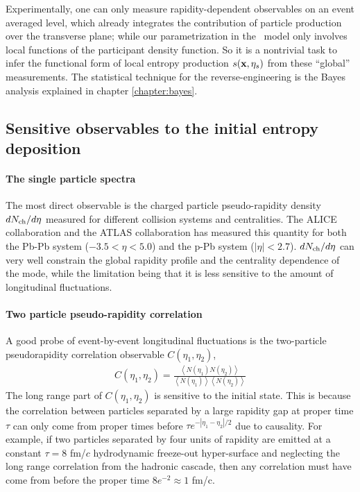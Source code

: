 Experimentally, one can only measure rapidity-dependent observables on an event averaged level, which already integrates the contribution of particle production over the transverse plane; while our parametrization in the \trento\ model only involves local functions of the participant density function.
So it is a nontrivial task to infer the functional form of local entropy production $s(\mathbf x, \eta_s)$ from these ``global'' measurements.
The statistical technique for the reverse-engineering is the Bayes analysis explained in chapter \ref{chapter:bayes}.

\subsection{Sensitive observables to the initial entropy deposition}
\paragraph{The single particle spectra}
The most direct observable is the charged particle pseudo-rapidity density $dN_\text{ch}/d\eta$ measured for different collision systems and centralities.
The ALICE collaboration and the ATLAS collaboration has measured this quantity for both the Pb-Pb system ($-3.5<\eta<5.0$) and the p-Pb system ($|\eta| < 2.7$).
$dN_\text{ch}/d\eta$ can very well constrain the global rapidity profile and the centrality dependence of the mode, while the limitation being that it is less sensitive to the amount of longitudinal fluctuations.

\paragraph{Two particle pseudo-rapidity correlation}
A good probe of event-by-event longitudinal fluctuations is the two-particle pseudorapidity correlation observable $C(\eta_1, \eta_2)$,
\begin{eqnarray}
C(\eta_1, \eta_2) = \frac{ \left\langle N(\eta_1)N(\eta_2) \right\rangle}{\left\langle N(\eta_1)\right\rangle\left\langle N(\eta_2) \right\rangle}
\end{eqnarray}
The long range part of $C(\eta_1, \eta_2)$ is sensitive to the initial state.
This is because the correlation between particles separated by a large rapidity gap at proper time $\tau$ can only come from proper times before $\tau e^{-|\eta_1-\eta_2|/2}$ due to causality.
For example, if two particles separated by four units of rapidity are emitted at a constant $\tau = 8$ fm/$c$ hydrodynamic freeze-out hyper-surface and neglecting the long range correlation from the hadronic cascade, then any correlation must have come from before the proper time $ 8 e^{-2}\approx 1$ fm/c.

